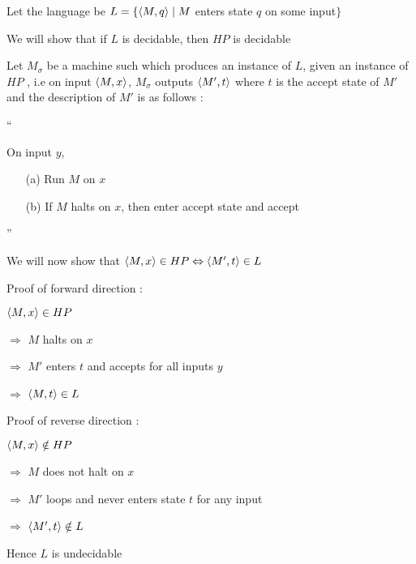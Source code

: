 
Let the language be $L = \{ \langle M, q \rangle \mid M$ enters state $q$ on some input$\}$ 

We will show that if $L$ is decidable, then $HP$ is decidable

Let $M_\sigma$ be a machine such which produces an instance of $L$, given an instance of $HP$ , i.e 
on input $\langle M, x \rangle$, $M_\sigma$ outputs $\langle M', t \rangle$ where $t$ is the accept state of $M'$ and the description of $M'$ is as follows :

``

On input $y$,
\begin{enumerate}
    \item[(a)] Run $M$ on $x$
    \item[(b)] If $M$ halts on $x$, then enter accept state and accept
\end{enumerate}

''

We will now show that
$\langle M, x \rangle \in HP \Leftrightarrow \langle M', t \rangle \in L$

Proof of forward direction : 

$\langle M, x \rangle \in HP$

$\Rightarrow$
$M$ halts on $x$

$\Rightarrow$
$M'$ enters $t$ and accepts for all inputs $y$

$\Rightarrow$
$\langle M, t \rangle \in L$


Proof of reverse direction : 

$\langle M, x \rangle \notin HP$

$\Rightarrow$
$M$ does not halt on $x$

$\Rightarrow$
$M'$ loops and never enters state $t$ for any input

$\Rightarrow$
$\langle M', t \rangle \notin L$

Hence $L$ is undecidable



